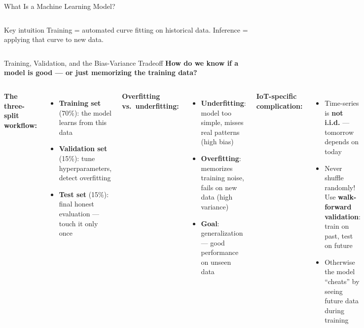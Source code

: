 \documentclass[aspectratio=169,11pt]{beamer}
\begin{document}
\begin{frame}{What Is a Machine Learning Model?}
\begin{columns}
        \vspace{0.03cm}
        \begin{alertblock}{Key intuition}
            Training = automated curve fitting on historical data. Inference = applying that curve to new data.
        \end{alertblock}
    \end{columns}
\end{frame}

\begin{frame}{Training, Validation, and the Bias-Variance Tradeoff}
    \scriptsize
    \textbf{How do we know if a model is good --- or just memorizing the training data?}

    \vspace{0.03cm}
    \begin{columns}
        \textbf{The three-split workflow:}
        \begin{itemize}\setlength{\itemsep}{0pt}
            \item \textbf{Training set} (70\%): the model learns from this data
            \item \textbf{Validation set} (15\%): tune hyperparameters, detect overfitting
            \item \textbf{Test set} (15\%): final honest evaluation --- touch it only once
        \end{itemize}

        \vspace{0.03cm}
        \textbf{Overfitting vs.\ underfitting:}
        \begin{itemize}\setlength{\itemsep}{0pt}
            \item \textbf{Underfitting}: model too simple, misses real patterns (high bias)
            \item \textbf{Overfitting}: memorizes training noise, fails on new data (high variance)
            \item \textbf{Goal}: generalization --- good performance on unseen data
        \end{itemize}

        \textbf{IoT-specific complication:}
        \begin{itemize}\setlength{\itemsep}{0pt}
            \item Time-series is \textbf{not i.i.d.} --- tomorrow depends on today
            \item Never shuffle randomly! Use \textbf{walk-forward validation}: train on past, test on future
            \item Otherwise the model ``cheats'' by seeing future data during training
        \end{itemize}


\end{columns}
\end{frame}
\end{document}
